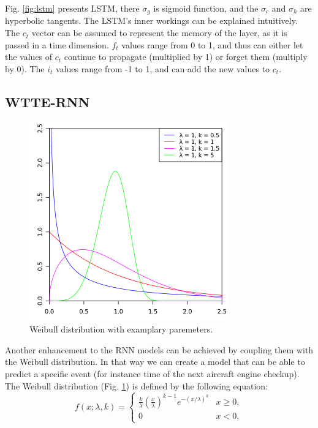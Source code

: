 
Fig. \ref{fig:lstm} presents LSTM, there $\sigma_g$ is sigmoid function, and the $\sigma_{c}$ and $\sigma_{h}$ are hyperbolic tangents.
The LSTM's inner workings can be explained intuitively. The $c_{t}$ vector can be assumed to represent the memory of the layer, as it is passed in  a time dimension. $f_{t}$ values range from 0 to 1, and thus can either let the values of $c_{t}$ continue to propagate (multiplied by 1) or forget them (multiply by 0). The $i_{t}$ values range from -1 to 1, and can add the new values to $c_{t}$.

\subsection{WTTE-RNN}
\label{sec:wtte_rnn}

\begin{figure}
  \centering
  \includegraphics[width=0.5\linewidth]{figures/chapter3/325px-Weibull_PDF.svg.png}
  \caption[wei]{Weibull distribution with examplary paremeters\footnotemark. }
  \label{fig:weibull}

\end{figure}

Another enhancement to the RNN models can be achieved by coupling them with the Weibull distribution. In that way we can create a model that can be able to predict a specific event (for instance time of the next aircraft engine checkup).
The Weibull distribution (Fig. \ref{fig:weibull}) is defined by the following equation:
\begin{equation}
f(x;\lambda,k) =
\begin{cases}
\frac{k}{\lambda}\left(\frac{x}{\lambda}\right)^{k-1}e^{-(x/\lambda)^{k}} & x\geq0 ,\\
0 & x<0,
\end{cases}
\end{equation}

